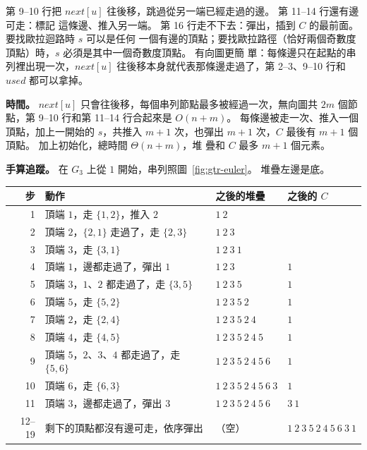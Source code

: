 第 9--10 行把 $\mathit{next}[u]$ 往後移，跳過從另一端已經走過的邊。 第 11--14 行還有邊可走：標記
這條邊、推入另一端。 第 16 行走不下去：彈出，插到 $C$ 的最前面。 要找歐拉迴路時 $s$ 可以是任何
一個有邊的頂點；要找歐拉路徑（恰好兩個奇數度頂點）時，$s$ 必須是其中一個奇數度頂點。 有向圖更簡
單：每條邊只在起點的串列裡出現一次，$\mathit{next}[u]$ 往後移本身就代表那條邊走過了，第 2--3、9--10
行和 $\mathit{used}$ 都可以拿掉。

\textbf{時間。} $\mathit{next}[u]$ 只會往後移，每個串列節點最多被經過一次，無向圖共 $2m$ 個節點，第
9--10 行和第 11--14 行合起來是 $O(n + m)$。 每條邊被走一次、推入一個頂點，加上一開始的 $s$，共推入
$m + 1$ 次，也彈出 $m + 1$ 次，$C$ 最後有 $m + 1$ 個頂點。 加上初始化，總時間 $\Theta(n + m)$，堆
疊和 $C$ 最多 $m + 1$ 個元素。

\textbf{手算追蹤。} 在 $G_3$ 上從 $1$ 開始，串列照圖~\ref{fig:gtr-euler}。 堆疊左邊是底。

\begin{center}
\small
\begin{tabular}{rlll}
\toprule
步 & 動作 & 之後的堆疊 & 之後的 $C$ \\
\midrule
1 & 頂端 $1$，走 $\{1, 2\}$，推入 $2$ & $1\ 2$ & \\
2 & 頂端 $2$，$\{2, 1\}$ 走過了，走 $\{2, 3\}$ & $1\ 2\ 3$ & \\
3 & 頂端 $3$，走 $\{3, 1\}$ & $1\ 2\ 3\ 1$ & \\
4 & 頂端 $1$，邊都走過了，彈出 $1$ & $1\ 2\ 3$ & $1$ \\
5 & 頂端 $3$，$1$、$2$ 都走過了，走 $\{3, 5\}$ & $1\ 2\ 3\ 5$ & $1$ \\
6 & 頂端 $5$，走 $\{5, 2\}$ & $1\ 2\ 3\ 5\ 2$ & $1$ \\
7 & 頂端 $2$，走 $\{2, 4\}$ & $1\ 2\ 3\ 5\ 2\ 4$ & $1$ \\
8 & 頂端 $4$，走 $\{4, 5\}$ & $1\ 2\ 3\ 5\ 2\ 4\ 5$ & $1$ \\
9 & 頂端 $5$，$2$、$3$、$4$ 都走過了，走 $\{5, 6\}$ & $1\ 2\ 3\ 5\ 2\ 4\ 5\ 6$ & $1$ \\
10 & 頂端 $6$，走 $\{6, 3\}$ & $1\ 2\ 3\ 5\ 2\ 4\ 5\ 6\ 3$ & $1$ \\
11 & 頂端 $3$，邊都走過了，彈出 $3$ & $1\ 2\ 3\ 5\ 2\ 4\ 5\ 6$ & $3\ 1$ \\
12--19 & 剩下的頂點都沒有邊可走，依序彈出 & （空） & $1\ 2\ 3\ 5\ 2\ 4\ 5\ 6\ 3\ 1$ \\
\bottomrule
\end{tabular}
\end{center}

